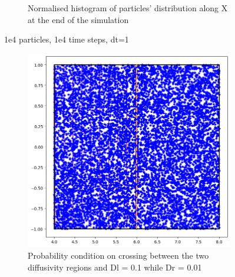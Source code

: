 \documentclass{article}
\begin{document}
\begin{figure}[htbp]
\begin{subfigure}[b]{0.45\textwidth}
        \caption{Normalised histogram of particles' distribution along X at the end of the simulation}
    \end{subfigure}
    \caption{1e4 particles, 1e4 time steps, dt=1}
    \label{fig:MatrixDiffusion3}
\end{figure}

\begin{figure}[htbp]
    \centering
    \begin{subfigure}[b]{0.45\textwidth}
        \centering
        \includegraphics[width=\textwidth]{images/positionsDl01Dr001RlPlRrPr.png}
        \caption{Probability condition on crossing between the two diffusivity regions and Dl = 0.1 while Dr = 0.01}
    \end{subfigure}
    \hfill
    \begin{subfigure}[b]{0.45\textwidth}
        \centering

\end{subfigure}
\end{figure}
\end{document}
